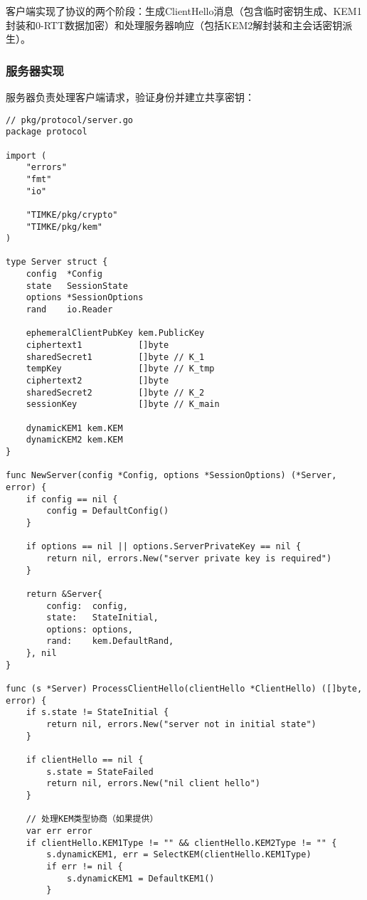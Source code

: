 客户端实现了协议的两个阶段：生成ClientHello消息（包含临时密钥生成、KEM1封装和0-RTT数据加密）和处理服务器响应（包括KEM2解封装和主会话密钥派生）。

\subsubsection{服务器实现}

服务器负责处理客户端请求，验证身份并建立共享密钥：

\begin{verbatim}
// pkg/protocol/server.go
package protocol

import (
    "errors"
    "fmt"
    "io"

    "TIMKE/pkg/crypto"
    "TIMKE/pkg/kem"
)

type Server struct {
    config  *Config
    state   SessionState
    options *SessionOptions
    rand    io.Reader

    ephemeralClientPubKey kem.PublicKey
    ciphertext1           []byte
    sharedSecret1         []byte // K_1
    tempKey               []byte // K_tmp
    ciphertext2           []byte
    sharedSecret2         []byte // K_2
    sessionKey            []byte // K_main

    dynamicKEM1 kem.KEM
    dynamicKEM2 kem.KEM
}

func NewServer(config *Config, options *SessionOptions) (*Server, error) {
    if config == nil {
        config = DefaultConfig()
    }

    if options == nil || options.ServerPrivateKey == nil {
        return nil, errors.New("server private key is required")
    }

    return &Server{
        config:  config,
        state:   StateInitial,
        options: options,
        rand:    kem.DefaultRand,
    }, nil
}

func (s *Server) ProcessClientHello(clientHello *ClientHello) ([]byte, error) {
    if s.state != StateInitial {
        return nil, errors.New("server not in initial state")
    }

    if clientHello == nil {
        s.state = StateFailed
        return nil, errors.New("nil client hello")
    }

    // 处理KEM类型协商（如果提供）
    var err error
    if clientHello.KEM1Type != "" && clientHello.KEM2Type != "" {
        s.dynamicKEM1, err = SelectKEM(clientHello.KEM1Type)
        if err != nil {
            s.dynamicKEM1 = DefaultKEM1()
        }


\end{verbatim}
